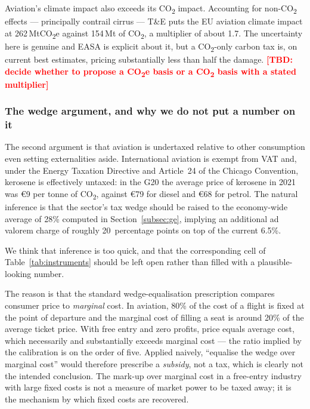 \documentclass[11pt]{article}
\newcommand{\tbd}[1]{\textcolor{red}{\textbf{[TBD: #1]}}}
\begin{document}
Aviation's climate impact also exceeds its CO\textsubscript{2} impact.
Accounting for non-CO\textsubscript{2} effects --- principally
contrail cirrus --- T\&E puts the EU aviation climate impact at 262\,MtCO\textsubscript{2}e
against 154\,Mt of CO\textsubscript{2}, a multiplier of about 1.7. The
uncertainty here is genuine and EASA is explicit about it, but a
CO\textsubscript{2}-only carbon tax is, on current best estimates, pricing
substantially less than half the damage. \tbd{decide whether to propose a
CO\textsubscript{2}e basis or a CO\textsubscript{2} basis with a stated
multiplier}

\subsubsection{The wedge argument, and why we do not put a number on it}
\label{subsec:wedge}

The second argument is that aviation is undertaxed relative to other consumption
even setting externalities aside. International aviation is exempt from VAT and,
under the Energy Taxation Directive and Article~24 of the Chicago Convention,
kerosene is effectively untaxed: in the G20 the average price of kerosene in
2021 was €9 per tonne of CO\textsubscript{2}, against €79 for diesel and €68
for petrol. The natural inference is that the sector's tax wedge should be
raised to the economy-wide average of 28\% computed in
Section~\ref{subsec:ge}, implying an additional ad valorem charge of roughly
20~percentage points on top of the current 6.5\%.

We think that inference is too quick, and that the corresponding cell of
Table~\ref{tab:instruments} should be left open rather than filled with a
plausible-looking number.

The reason is that the standard wedge-equalisation prescription compares
consumer price to \emph{marginal} cost. In aviation, 80\% of the cost of a
flight is fixed at the point of departure and the marginal cost of filling a
seat is around 20\% of the average ticket price. With free entry and zero
profits, price equals average cost, which necessarily and substantially exceeds
marginal cost --- the ratio implied by the calibration is on the order of five.
Applied naively, ``equalise the wedge over marginal cost'' would therefore
prescribe a \emph{subsidy}, not a tax, which is clearly not the intended
conclusion. The mark-up over marginal cost in a free-entry industry with large
fixed costs is not a measure of market power to be taxed away; it is the
mechanism by which fixed costs are recovered.
\end{document}
